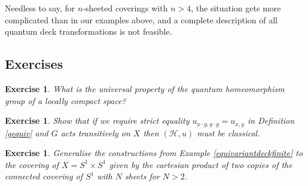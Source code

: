 \documentclass[a4paper]{amsart}
\newcommand*{\Hc}{\mathcal{H}}
\numberwithin{equation}{section}
\theoremstyle{change}
\newtheorem{exercise}[theorem]{Exercise}
\begin{document}
Needless to say, for $ n $-sheeted coverings with $ n > 4 $, the situation gets more complicated than in our examples above, and a complete description of all quantum deck transformations is not feasible.


\subsection{Exercises}

\begin{exercise}
What is the universal property of the quantum homeomorphism group of a locally compact space? 
\end{exercise}

\begin{exercise} \label{ex142}
Show that if we require strict equality $ u_{x \cdot g, y \cdot g} = u_{x,y} $ in Definition \ref{gequiv} and $ G $ acts transitively on $ X $ then $ (\Hc, u) $ must be classical. 
\end{exercise}

\begin{exercise}
Generalise the constructions from Example \ref{equivariantdeckfinite} to the covering of $ X = S^1 \times S^1 $ given by the cartesian product of two copies of the connected covering of $ S^1 $ with $ N $ sheets for $ N > 2 $. 
\end{exercise}
\end{document}
